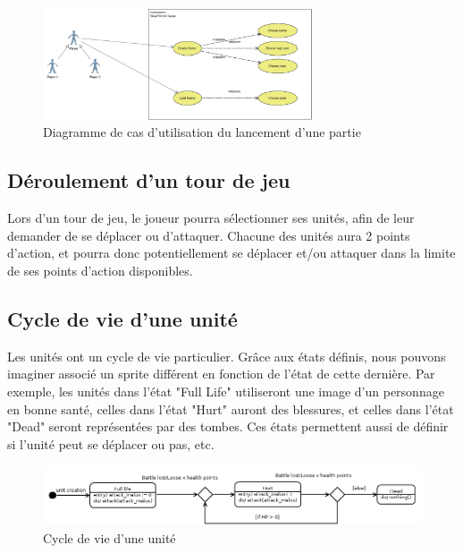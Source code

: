 \begin{figure}[h]
  \centering
  \includegraphics[width=8cm]{schemas/uc_game_creation.png}
  \caption{Diagramme de cas d'utilisation du lancement d'une partie}
  \label{uc_game_creation}
\end{figure}


\subsection{Déroulement d'un tour de jeu}
Lors d'un tour de jeu, le joueur pourra sélectionner ses unités, afin de leur demander de se déplacer ou d'attaquer. Chacune des unités aura 2 points d'action, et pourra donc potentiellement se déplacer et/ou attaquer dans la limite de ses points d'action disponibles.


\subsection{Cycle de vie d'une unité}

Les unités ont un cycle de vie particulier. Grâce aux états définis, nous pouvons imaginer associé un sprite différent en fonction de l'état de cette dernière. Par exemple, les unités dans l'état "Full Life" utiliseront une image d'un personnage en bonne santé, celles dans l'état "Hurt" auront des blessures, et celles dans l'état "Dead" seront représentées par des tombes. Ces états permettent aussi de définir si l'unité peut se déplacer ou pas, etc.

\begin{figure}[!h]
  \centering
  \includegraphics[width=13cm]{schemas/state-diagram.png}
  \caption{Cycle de vie d'une unité}
  \label{state-diagram}
\end{figure}


